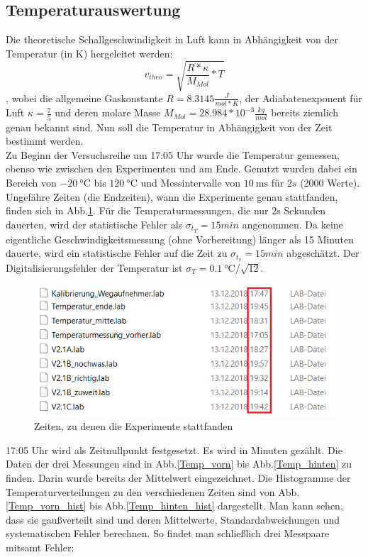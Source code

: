 \documentclass[]{article}
\begin{document}
	\subsection{Temperaturauswertung}
	Die theoretische Schallgeschwindigkeit in Luft kann in Abhängigkeit von der Temperatur (in K) hergeleitet werden:
	\begin{equation}
	v_{theo}=\sqrt{\frac{R*\kappa}{M_{Mol}}*T}
	\label{v(T)}
	\end{equation}
	, wobei die allgemeine Gaskonstante $R=8.3145 \frac{J}{mol*K}$, der Adiabatenexponent für Luft $\kappa=\frac{7}{5}$ und deren molare Masse $M_{Mol}=28.984*10^{-3} \frac{kg}{mol}$ bereits ziemlich genau bekannt sind.
	Nun soll die Temperatur in Abhängigkeit von der Zeit bestimmt werden.\\
	Zu Beginn der Versuchsreihe um 17:05 Uhr wurde die Temperatur gemessen, ebenso wie zwischen den Experimenten und am Ende. Genutzt wurden dabei ein Bereich von $\SI{-20}{\celsius}$ bis $\SI{120}{\celsius}$ und Messintervalle von $\SI{10}{\milli\second}$ für $2s$ (2000 Werte).
	Ungefähre Zeiten (die Endzeiten), wann die Experimente genau stattfanden, finden sich in Abb.\ref{Temp_Zeiten}. Für die Temperaturmessungen, die nur 2s Sekunden dauerten, wird der statistische Fehler als $\sigma_{t_T}=15min$ angenommen. Da keine eigentliche Geschwindigkeitsmessung (ohne Vorbereitung) länger als 15 Minuten dauerte, wird ein statistische Fehler auf die Zeit zu $\sigma_{t_v}=15min$ abgeschätzt. Der Digitalisierungsfehler der Temperatur ist $\sigma_T=\SI{0.1}{\celsius}/\sqrt{12}$.\\
	
	\begin{figure}
		\begin{center}
			\includegraphics[scale=0.9]{Images/Messreihenendzeiten.png}
			\caption{Zeiten, zu denen die Experimente stattfanden}
			\label{Temp_Zeiten}
		\end{center}
	\end{figure}
	17:05 Uhr wird als Zeitnullpunkt festgesetzt. Es wird in Minuten gezählt. Die Daten der drei Messungen sind in Abb.\ref{Temp_vorn} bis Abb.\ref{Temp_hinten} zu finden. Darin wurde bereits der Mittelwert eingezeichnet. Die Histogramme der Temperaturverteilungen zu den verschiedenen Zeiten sind von Abb.\ref{Temp_vorn_hist}
 	bis Abb.\ref{Temp_hinten_hist} dargestellt. Man kann sehen, dass sie gaußverteilt sind und deren Mittelwerte, Standardabweichungen und systematischen Fehler berechnen. So findet man schließlich drei Messpaare mitsamt Fehler:
 	
\end{document}
